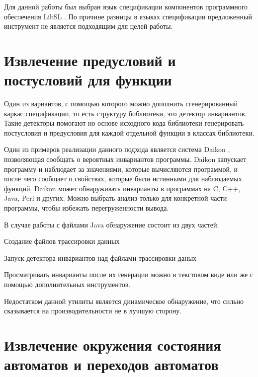 Для данной работы был выбран язык спецификации компонентов программного обеспечения LibSL \cite{libsl} \cite{libsl2}. По причине разницы в языках спецификации предложенный инструмент не является подходящим для целей работы.

\section{Извлечение предусловий и постусловий для функции}

Один из вариантов, с помощью которого можно дополнить сгенерированный каркас спецификации, то есть структуру библиотеки, это детектор инвариантов. Такие детекторы помогают но основе исходного кода библиотеки генерировать постусловия и предусловия для каждой отдельной функции в классах библиотеки.

Один из примеров реализации данного подхода является система Daikon \cite{daikon} \cite{daikon_paper}, позволяющая сообщать о вероятных инвариантов программы. Daikon запускает программу и наблюдает за значениями, которые вычисляются программой, и после чего сообщает о свойствах, которые были истинными для наблюдаемых функций.
Daikon может обнаруживать инварианты в программах на C, C++, Java, Perl и других. Можно выбрать анализ только для конкретной части программы, чтобы избежать перегруженности вывода.

В случае работы с файлами Java обнаружение состоит из двух частей:
%
\begin{itemize*}
\item Создание файлов трассировки данных
\item Запуск детектора инвариантов над файлами трассировки даных
\end{itemize*}
%
Просматривать инварианты после их генерации можно в текстовом виде или же с помощью дополнительных инструментов.

Недостатком данной утилиты является динамическое обнаружение, что сильно сказывается на производительности не в лучшую сторону.

\section{Извлечение окружения состояния автоматов и переходов автоматов}


